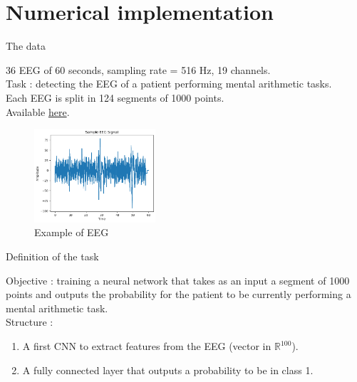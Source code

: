 \section{Numerical implementation}


\begin{frame}{The data}

    36 EEG of 60 seconds, sampling rate = 516 Hz, 19 channels. \\

    Task : detecting the EEG of a patient performing mental arithmetic tasks. \\

    Each EEG is split in 124 segments of 1000 points. \\

    Available \href{https://www.kaggle.com/datasets/amananandrai/complete-eeg-dataset/data}{here}. 

    \begin{figure}
        \centering
        \includegraphics[width=0.4\textwidth]{figures/example_eeg.png}
        \caption{Example of EEG}
    \end{figure}
\end{frame}


\begin{frame}{Definition of the task}

    Objective : training a neural network that takes as an input a segment of 1000 points and outputs the probability for the patient to be currently performing a mental arithmetic task. \\[1cm]
    
    Structure : 
    \begin{enumerate}
        \item A first CNN to extract features from the EEG (vector  in $\mathbb{R}^{100}$). 
        \item A fully connected layer that outputs a probability to be in class 1. 
    \end{enumerate}

\end{frame}


